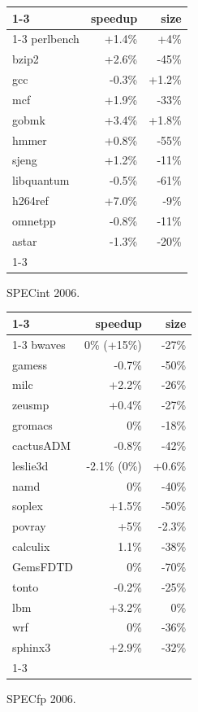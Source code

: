 \documentclass[final]{ols}
\begin{document}
\begin{figure}[t]
\begin{center}
\begin{tabular}{|l|r|r|}
\cline{1-3}
	  & speedup & size \\
\cline{1-3}
perlbench &+1.4\%   &  +4\%\\
bzip2     &+2.6\%   &  -45\%\\
gcc       &-0.3\%   &  +1.2\%\\
mcf       &+1.9\%   &  -33\%\\
gobmk     &+3.4\%   &  +1.8\%\\
hmmer     &+0.8\%   &  -55\%\\
sjeng     &+1.2\%   &  -11\%\\
libquantum&-0.5\%   &  -61\%\\
h264ref   &+7.0\%   &  -9\%\\
omnetpp   &-0.8\%   &  -11\%\\
astar     &-1.3\%   &  -20\%\\
\cline{1-3}
\end{tabular}
\end{center}
  \caption{SPECint 2006.}
\label{specint}
\end{figure}
\begin{figure}[t]
\begin{center}
\begin{tabular}{|l|r|r|}
\cline{1-3}
	  & speedup & size \\
\cline{1-3}
bwaves    &0\%  (+15\%)&  -27\%\\
gamess    &-0.7\%      & -50\%\\
milc      &+2.2\%      & -26\%\\
zeusmp    &+0.4\%      & -27\%\\
gromacs   &0\%	   &-18\%\\
cactusADM &-0.8\%      & -42\%\\
leslie3d  &-2.1\%  (0\%)&  +0.6\%\\
namd      &0\%         & -40\%\\
soplex    &+1.5\%      & -50\%\\
povray    &+5\%        & -2.3\%\\
calculix  &1.1\%	   &-38\%\\
GemsFDTD  &0\%         & -70\%\\
tonto     &-0.2\%      & -25\%\\
lbm       &+3.2\%      & 0\%\\
wrf       &0\%	   &-36\%\\
sphinx3   &+2.9\%      & -32\%\\
\cline{1-3}
\end{tabular}
\end{center}
  \caption{SPECfp 2006.}
\label{specfp}
\end{figure}
\end{document}

